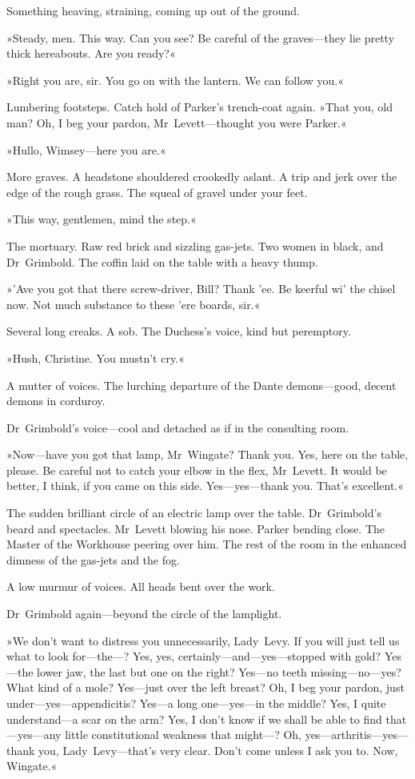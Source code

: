 Something heaving, straining, coming up out of the ground.

»Steady, men. This way. Can you see? Be careful of the graves—they lie pretty thick hereabouts. Are you ready?«

»Right you are, sir. You go on with the lantern. We can follow you.«

Lumbering footsteps. Catch hold of Parker's trench-coat again. »That you, old man? Oh, I beg your pardon, Mr~Levett—thought you were Parker.«

»Hullo, Wimsey—here you are.«

More graves. A headstone shouldered crookedly aslant. A trip and jerk over the edge of the rough grass. The squeal of gravel under your feet.

»This way, gentlemen, mind the step.«

The mortuary. Raw red brick and sizzling gas-jets. Two women in black, and Dr~Grimbold. The coffin laid on the table with a heavy thump.

»'Ave you got that there screw-driver, Bill? Thank 'ee. Be keerful wi' the chisel now. Not much substance to these 'ere boards, sir.«

Several long creaks. A sob. The Duchess's voice, kind but peremptory.

»Hush, Christine. You mustn't cry.«

A mutter of voices. The lurching departure of the Dante demons—good, decent demons in corduroy.

Dr~Grimbold's voice—cool and detached as if in the consulting room.

»Now—have you got that lamp, Mr~Wingate? Thank you. Yes, here on the table, please. Be careful not to catch your elbow in the flex, Mr~Levett. It would be better, I think, if you came on this side. Yes—yes—thank you. That's excellent.«

The sudden brilliant circle of an electric lamp over the table. Dr~Grimbold's beard and spectacles. Mr~Levett blowing his nose. Parker bending close. The Master of the Workhouse peering over him. The rest of the room in the enhanced dimness of the gas-jets and the fog.

A low murmur of voices. All heads bent over the work.

Dr~Grimbold again—beyond the circle of the lamplight.

»We don't want to distress you unnecessarily, Lady~Levy. If you will just tell us what to look for—the---? Yes, yes, certainly—and—yes—stopped with gold? Yes—the lower jaw, the last but one on the right? Yes—no teeth missing—no—yes? What kind of a mole? Yes—just over the left breast? Oh, I beg your pardon, just under—yes—ap\-pen\-dici\-tis? Yes—a long one—yes—in the middle? Yes, I quite understand—a scar on the arm? Yes, I don't know if we shall be able to find that—yes—any little constitutional weakness that might---? Oh, yes—arthritis—yes—thank you, Lady~Levy—that's very clear. Don't come unless I ask you to. Now, Wingate.«

